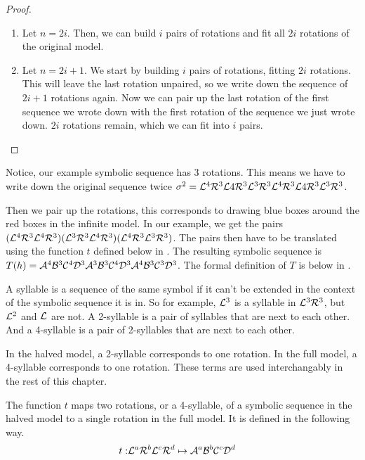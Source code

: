 \begin{proof} \phantom{x}
    \begin{enumerate}
        \item Let $n = 2i$. Then, we can build $i$ pairs of rotations and fit all $2i$ rotations of the original model.
        \item Let $n = 2i + 1$. We start by building $i$ pairs of rotations, fitting $2i$ rotations.
              This will leave the last rotation unpaired, so we write down the sequence of $2i + 1$ rotations again.
              Now we can pair up the last rotation of the first sequence we wrote down with the first rotation of the sequence we just wrote down.
              $2i$ rotations remain, which we can fit into $i$ pairs.
    \end{enumerate}
\end{proof}

Notice, our example symbolic sequence has 3 rotations.
This means we have to write down the original sequence twice $\sigma^2 = \mathcal{L}^4\mathcal{R}^3\mathcal{L}4\mathcal{R}^3\mathcal{L}^3\mathcal{R}^3\mathcal{L}^4\mathcal{R}^3\mathcal{L}4\mathcal{R}^3\mathcal{L}^3\mathcal{R}^3$.

Then we pair up the rotations, this corresponds to drawing blue boxes around the red boxes in the infinite model.
In our example, we get the pairs $(\mathcal{L}^4\mathcal{R}^3\mathcal{L}^4\mathcal{R}^3)(\mathcal{L}^3\mathcal{R}^3\mathcal{L}^4\mathcal{R}^3)(\mathcal{L}^4\mathcal{R}^3\mathcal{L}^3\mathcal{R}^3)$.
The pairs then have to be translated using the function $t$ defined below in .
The resulting symbolic sequence is $T(h) = \mathcal{A}^4\mathcal{B}^3\mathcal{C}^4\mathcal{D}^3\mathcal{A}^3\mathcal{B}^3\mathcal{C}^4\mathcal{D}^3\mathcal{A}^4\mathcal{B}^3\mathcal{C}^3\mathcal{D}^3$.
The formal definition of $T$ is below in .

\begin{definition}[Syllables]
    A syllable is a sequence of the same symbol if it can't be extended in the context of the symbolic sequence it is in.
    So for example, $\mathcal{L}^3$ is a syllable in $\mathcal{L}^3\mathcal{R}^3$, but $\mathcal{L}^2$ and $\mathcal{L}$ are not.
    A 2-syllable is a pair of syllables that are next to each other.
    And a 4-syllable is a pair of 2-syllables that are next to each other.

    In the halved model, a 2-syllable corresponds to one rotation.
    In the full model, a 4-syllable corresponds to one rotation.
    These terms are used interchangably in the rest of this chapter.
\end{definition}

\begin{definition}
    \label{def:t}
    The function $t$ maps two rotations, or a 4-syllable, of a symbolic sequence in the halved model to a single rotation in the full model.
    It is defined in the following way.
    \begin{align}
        t: & \mathcal{L}^a\mathcal{R}^b\mathcal{L}^c\mathcal{R}^d \mapsto \mathcal{A}^a\mathcal{B}^b\mathcal{C}^c\mathcal{D}^d
    \end{align}
\end{definition}


